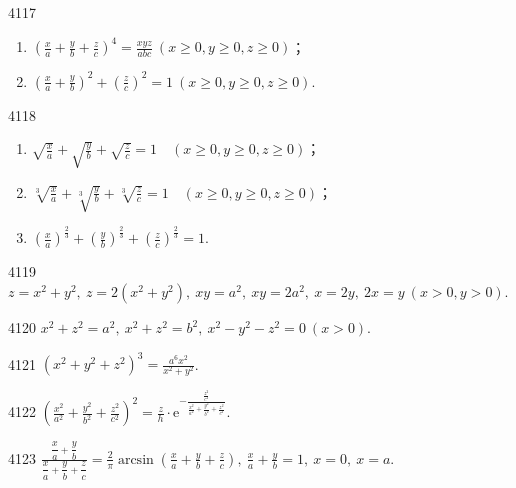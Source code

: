 \begin{prob}[M]{4117}
\begin{enumerate}[label=(\alph*), itemsep=2pt, topsep=3pt]
\item $\displaystyle \left(\frac{x}{a}+\frac{y}{b}+\frac{z}{c}\right)^4 = \frac{xyz}{abc}\ (x \geqslant 0, y \geqslant 0, z \geqslant 0)$；
\item $\displaystyle \left(\frac{x}{a}+\frac{y}{b}\right)^2 + \left(\frac{z}{c}\right)^2 = 1\ (x \geqslant 0, y \geqslant 0, z \geqslant 0)$.
\end{enumerate}
\end{prob}

\begin{prob}[L]{4118}
\begin{enumerate}[label=(\alph*), itemsep=2pt, topsep=3pt]
\item $\displaystyle \sqrt{\frac{x}{a}}+\sqrt{\frac{y}{b}}+\sqrt{\frac{z}{c}} = 1 \quad (x \geqslant 0, y \geqslant 0, z \geqslant 0)$；
\item $\displaystyle \sqrt[3]{\frac{x}{a}}+\sqrt[3]{\frac{y}{b}}+\sqrt[3]{\frac{z}{c}} = 1 \quad (x \geqslant 0, y \geqslant 0, z \geqslant 0)$；
\item $\displaystyle \left(\frac{x}{a}\right)^{\frac{2}{3}}+\left(\frac{y}{b}\right)^{\frac{2}{3}}+\left(\frac{z}{c}\right)^{\frac{2}{3}} = 1$.
\end{enumerate}
\end{prob}

\begin{prob}[S]{4119}
$z=x^2+y^2,\ z=2(x^2+y^2),\ xy=a^2,\ xy=2a^2,\ x=2y,\ 2x=y\ (x>0, y>0)$.
\end{prob}

\begin{prob}[S]{4120}
$x^2+z^2=a^2,\ x^2+z^2=b^2,\ x^2-y^2-z^2=0\ (x>0)$.
\end{prob}

\begin{prob}[S]{4121}
$\displaystyle (x^2+y^2+z^2)^3 = \frac{a^6 x^2}{x^2+y^2}$.
\end{prob}

\begin{prob}[S]{4122}
$\displaystyle \left(\frac{x^2}{a^2}+\frac{y^2}{b^2}+\frac{z^2}{c^2}\right)^2 = \frac{z}{h} \cdot \mathrm{e}^{-\frac{\frac{z^2}{c^2}}{\frac{x^2}{a^2}+\frac{y^2}{b^2}+\frac{z^2}{c^2}}}$.
\end{prob}

\begin{prob}[S]{4123}
$\displaystyle \frac{\dfrac{x}{a}+\dfrac{y}{b}}{\dfrac{x}{a}+\dfrac{y}{b}+\dfrac{z}{c}} = \frac{2}{\pi} \arcsin\left(\frac{x}{a}+\frac{y}{b}+\frac{z}{c}\right),\ \frac{x}{a}+\frac{y}{b}=1,\ x=0,\ x=a$.
\end{prob}

